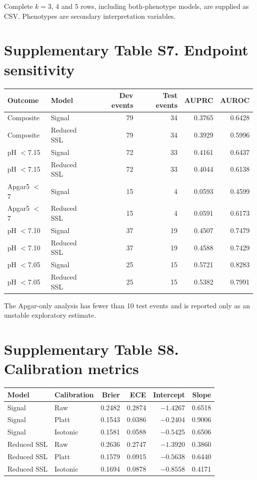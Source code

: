 \documentclass[11pt]{article}
\begin{document}
Complete $k=3$, 4 and 5 rows, including both-phenotype models, are supplied as CSV. Phenotypes are secondary interpretation variables.

\section*{Supplementary Table S7. Endpoint sensitivity}
\begin{tabular}{llrrrr}
\toprule
Outcome & Model & Dev events & Test events & AUPRC & AUROC \\
\midrule
Composite & Signal & 79 & 34 & 0.3765 & 0.6428 \\
Composite & Reduced SSL & 79 & 34 & 0.3929 & 0.5996 \\
pH $<$7.15 & Signal & 72 & 33 & 0.4161 & 0.6437 \\
pH $<$7.15 & Reduced SSL & 72 & 33 & 0.4044 & 0.6138 \\
Apgar5 $<$7 & Signal & 15 & 4 & 0.0593 & 0.4599 \\
Apgar5 $<$7 & Reduced SSL & 15 & 4 & 0.0591 & 0.6173 \\
pH $<$7.10 & Signal & 37 & 19 & 0.4507 & 0.7479 \\
pH $<$7.10 & Reduced SSL & 37 & 19 & 0.4588 & 0.7429 \\
pH $<$7.05 & Signal & 25 & 15 & 0.5721 & 0.8283 \\
pH $<$7.05 & Reduced SSL & 25 & 15 & 0.5382 & 0.7991 \\
\bottomrule
\end{tabular}

The Apgar-only analysis has fewer than 10 test events and is reported only as an unstable exploratory estimate.

\section*{Supplementary Table S8. Calibration metrics}
\begin{tabular}{llrrrr}
\toprule
Model & Calibration & Brier & ECE & Intercept & Slope \\
\midrule
Signal & Raw & 0.2482 & 0.2874 & $-1.4267$ & 0.6518 \\
Signal & Platt & 0.1543 & 0.0386 & $-0.2404$ & 0.9006 \\
Signal & Isotonic & 0.1581 & 0.0588 & $-0.5425$ & 0.6506 \\
Reduced SSL & Raw & 0.2636 & 0.2747 & $-1.3920$ & 0.3860 \\
Reduced SSL & Platt & 0.1579 & 0.0915 & $-0.5638$ & 0.6440 \\
Reduced SSL & Isotonic & 0.1694 & 0.0878 & $-0.8558$ & 0.4171 \\
\bottomrule
\end{tabular}
\end{document}
